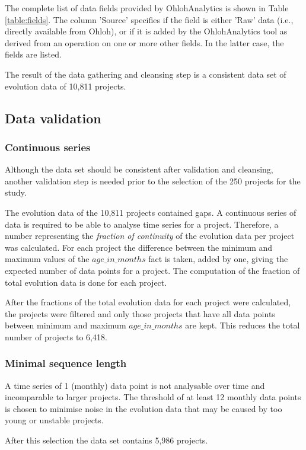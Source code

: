 The complete list of data fields provided by OhlohAnalytics is shown in Table
\ref{table:fields}. The column 'Source' specifies if the field is either 'Raw'
data (i.e., directly available from Ohloh), or if it is added by the
OhlohAnalytics tool as derived from an operation on one or more other fields.
In the latter case, the fields are listed.

The result of the data gathering and cleansing step is a consistent data set of
evolution data of 10,811 projects.



\subsection{Data validation}
\subsubsection{Continuous series}
Although the data set should be consistent after validation and cleansing,
another validation step is needed prior to the selection of the 250 projects
for the study.

The evolution data of the 10,811 projects contained gaps. A continuous series
of data is required to be able to analyse time series for a project. Therefore,
a number representing the \textit{fraction of continuity} of the evolution data
per project was calculated. For each project the difference between the minimum
and maximum values of the $age\_in\_months$ fact is taken, added by one, giving
the expected number of data points for a project. The computation of the
fraction of total evolution data is done for each project.

After the fractions of the total evolution data for each project were
calculated, the projects were filtered and only those projects that have all
data points between minimum and maximum $age\_in\_months$ are kept. This
reduces the total number of projects to 6,418.

\subsubsection{Minimal sequence length}
A time series of 1 (monthly) data point is not analysable over time and
incomparable to larger projects. The threshold of at least 12 monthly data
points is chosen to minimise noise in the evolution data that may be caused by
too young or unstable projects.

After this selection the data set contains 5,986 projects.

